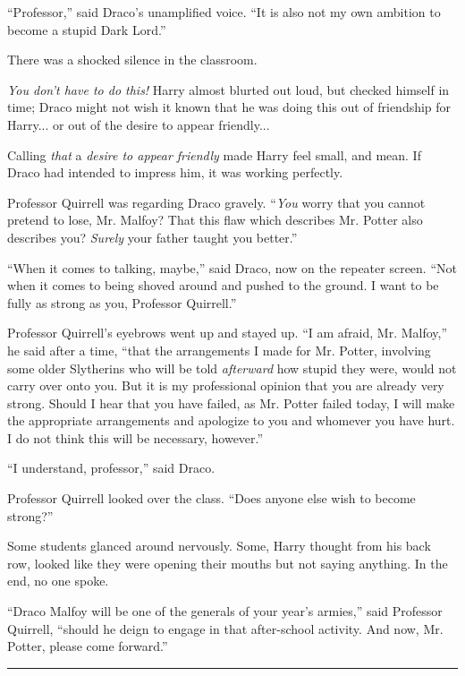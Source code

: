 ``Professor,'' said Draco's unamplified voice. ``It is also not my own ambition to become a stupid Dark Lord.''

There was a shocked silence in the classroom.

\emph{You don't have to do this!} Harry almost blurted out loud, but checked himself in time; Draco might not wish it known that he was doing this out of friendship for Harry... or out of the desire to appear friendly...

Calling \emph{that} a \emph{desire to appear friendly} made Harry feel small, and mean. If Draco had intended to impress him, it was working perfectly.

Professor Quirrell was regarding Draco gravely. ``\emph{You} worry that you cannot pretend to lose, Mr. Malfoy? That this flaw which describes Mr. Potter also describes you? \emph{Surely} your father taught you better.''

``When it comes to talking, maybe,'' said Draco, now on the repeater screen. ``Not when it comes to being shoved around and pushed to the ground. I want to be fully as strong as you, Professor Quirrell.''

Professor Quirrell's eyebrows went up and stayed up. ``I am afraid, Mr. Malfoy,'' he said after a time, ``that the arrangements I made for Mr. Potter, involving some older Slytherins who will be told \emph{afterward} how stupid they were, would not carry over onto you. But it is my professional opinion that you are already very strong. Should I hear that you have failed, as Mr. Potter failed today, I will make the appropriate arrangements and apologize to you and whomever you have hurt. I do not think this will be necessary, however.''

``I understand, professor,'' said Draco.

Professor Quirrell looked over the class. ``Does anyone else wish to become strong?''

Some students glanced around nervously. Some, Harry thought from his back row, looked like they were opening their mouths but not saying anything. In the end, no one spoke.

``Draco Malfoy will be one of the generals of your year's armies,'' said Professor Quirrell, ``should he deign to engage in that after-school activity. And now, Mr. Potter, please come forward.''

\begin{center}\rule{3in}{0.4pt}\end{center}

